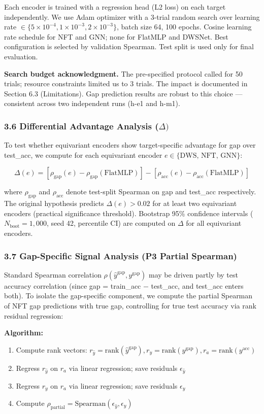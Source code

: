 Each encoder is trained with a regression head (L2 loss) on each target independently. We use Adam
optimizer with a 3-trial random search over learning rate $\in \{5\times10^{-4}, 1\times10^{-3},
2\times10^{-3}\}$, batch size 64, 100 epochs. Cosine learning rate schedule for NFT and GNN; none for
FlatMLP and DWSNet. Best configuration is selected by validation Spearman. Test split is used only for
final evaluation.

\textbf{Search budget acknowledgment.} The pre-specified protocol called for 50 trials; resource constraints
limited us to 3 trials. The impact is documented in Section 6.3 (Limitations). Gap prediction results are
robust to this choice --- consistent across two independent runs (h-e1 and h-m1).

\subsubsection{3.6 Differential Advantage Analysis ($\Delta )$}

To test whether equivariant encoders show target-specific advantage for gap over test\_acc, we compute
for each equivariant encoder $e \in \{\text{DWS, NFT, GNN}\}$:

$$\Delta(e) = [\rho_{\text{gap}}(e) - \rho_{\text{gap}}(\text{FlatMLP})] - [\rho_{\text{acc}}(e) - \rho_{\text{acc}}(\text{FlatMLP})]$$

where $\rho_{\text{gap}}$ and $\rho_{\text{acc}}$ denote test-split Spearman on gap and test\_acc
respectively. The original hypothesis predicts $\Delta(e) > 0.02$ for at least two equivariant encoders
(practical significance threshold). Bootstrap 95\% confidence intervals ($N_{\text{boot}} = 1{,}000$,
seed 42, percentile CI) are computed on $\Delta$ for all equivariant encoders.

\subsubsection{3.7 Gap-Specific Signal Analysis (P3 Partial Spearman)}

Standard Spearman correlation $\rho(\hat{y}^{\text{gap}}, y^{\text{gap}})$ may be driven partly by
test accuracy correlation (since gap = train\_acc $-$ test\_acc, and test\_acc enters both). To isolate
the gap-specific component, we compute the partial Spearman of NFT gap predictions with true gap,
controlling for true test accuracy via rank residual regression:

\textbf{Algorithm:}
\begin{enumerate}
\item Compute rank vectors: $r_{\hat{y}} = \text{rank}(\hat{y}^{\text{gap}}), r_y = \text{rank}(y^{\text{gap}}), r_a = \text{rank}(y^{\text{acc}})$
\item Regress $r_{\hat{y}}$ on $r_a$ via linear regression; save residuals $\epsilon_{\hat{y}}$
\item Regress $r_y$ on $r_a$ via linear regression; save residuals $\epsilon_y$
\item Compute $\rho_{\text{partial}} = \text{Spearman}(\epsilon_{\hat{y}}, \epsilon_y)$
\end{enumerate}

